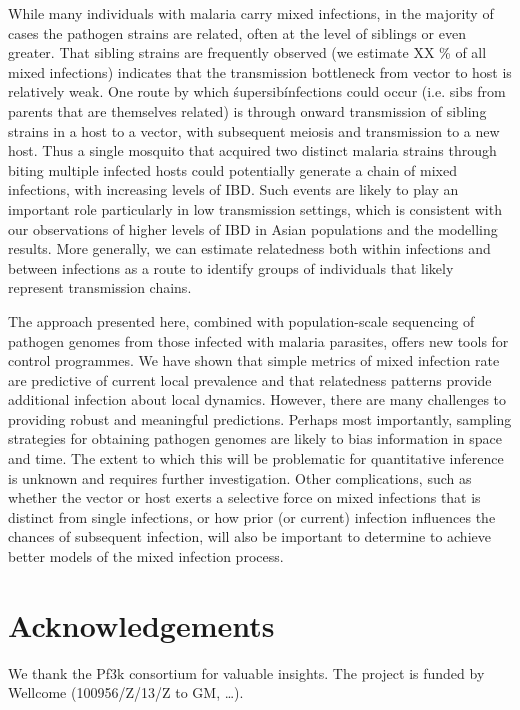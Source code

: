 \documentclass[9pt,lineno]{elife}
\begin{document}
While many individuals with malaria carry mixed infections, in the majority of cases the pathogen strains are related, often at the level of siblings or even greater.  That sibling strains are frequently observed (we estimate XX \% of all mixed infections) indicates that the transmission bottleneck from vector to host is relatively weak.  One route by which \'supersib\' infections could occur (i.e. sibs from parents that are themselves related) is through onward transmission of sibling strains in a host to a vector, with subsequent meiosis and transmission to a new host. Thus a single mosquito that acquired two distinct malaria strains through biting multiple infected hosts could potentially generate a chain of mixed infections, with increasing levels of IBD.  Such events are likely to play an important role particularly in low transmission settings, which is consistent with our observations of higher levels of IBD in Asian populations and the modelling results.  More generally, we can estimate relatedness both within infections and between infections as a route to identify groups of individuals that likely represent transmission chains.


The approach presented here, combined with population-scale sequencing of pathogen genomes from those infected with malaria parasites, offers new tools for control programmes.  We have shown that simple metrics of mixed infection rate are predictive of current local prevalence and that relatedness patterns provide additional infection about local dynamics.  However, there are many challenges to providing robust and meaningful predictions.  Perhaps most importantly, sampling strategies for obtaining pathogen genomes are likely to bias information in space and time.  The extent to which this will be problematic for quantitative inference is unknown and requires further investigation.  Other complications, such as whether the vector or host exerts a selective force on mixed infections that is distinct from single infections, or how prior (or current) infection influences the chances of subsequent infection, will also be important to determine to achieve better models of the mixed infection process.



\section{Acknowledgements}
We thank the Pf3k consortium for valuable insights. The project is funded by  Wellcome (100956/Z/13/Z to GM, \ldots).
\end{document}
